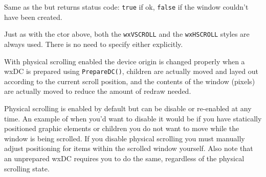 






\label{wxhvscrolledwindowcreate}


Same as the  but returns
status code: {\tt true} if ok, {\tt false} if the window couldn't have been created.

Just as with the ctor above, both the {\tt wxVSCROLL} and the {\tt wxHSCROLL}
styles are always used. There is no need to specify either explicitly.

\label{wxhvscrolledwindowenablephysicalscrolling}


With physical scrolling enabled the device origin is changed properly when a
wxDC is prepared using {\tt PrepareDC()}, children are actually moved and layed
out according to the current scroll position, and the contents of the window
(pixels) are actually moved to reduce the amount of redraw needed.

Physical scrolling is enabled by default but can be disable or re-enabled at
any time.  An example of when you'd want to disable it would be if you have
statically positioned graphic elements or children you do not want to move
while the window is being scrolled.  If you disable physical scrolling you must
manually adjust positioning for items within the scrolled window yourself.
Also note that an unprepared wxDC requires you to do the same, regardless of
the physical scrolling state.


\label{wxhvscrolledwindowestimatetotalheight}

